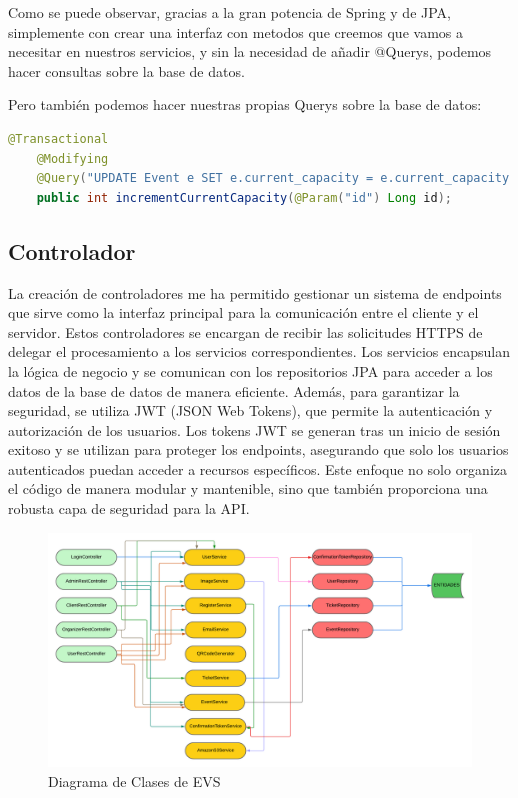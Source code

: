 Como se puede observar, gracias a la gran potencia de Spring y de JPA, simplemente con crear una interfaz con metodos que creemos que vamos a necesitar en 
nuestros servicios, y sin la necesidad de añadir @Querys, podemos hacer consultas sobre la base de datos.

Pero también podemos hacer nuestras propias Querys sobre la base de datos:
\myjavastyle
\begin{lstlisting}[language=Java, caption=Ejemplo de Query  en Spring Data JPA]
    @Transactional
    @Modifying
    @Query("UPDATE Event e SET e.current_capacity = e.current_capacity + 1 WHERE e.id = :id AND e.current_capacity + 1  <= e.max_capacity")
    public int incrementCurrentCapacity(@Param("id") Long id);
\end{lstlisting}

\subsection{Controlador}
La creación de controladores me ha permitido gestionar un sistema de endpoints que sirve como la interfaz principal 
para la comunicación entre el cliente y el servidor. Estos controladores se encargan de recibir las solicitudes HTTPS de delegar el procesamiento a 
los servicios correspondientes. Los servicios encapsulan la lógica de negocio y se comunican con los repositorios JPA para acceder a los datos de la 
base de datos de manera eficiente. Además, para garantizar la seguridad, se utiliza JWT (JSON Web Tokens), que permite la autenticación y autorización 
de los usuarios. Los tokens JWT se generan tras un inicio de sesión exitoso y se utilizan para proteger los endpoints, asegurando que solo los usuarios 
autenticados puedan acceder a recursos específicos. Este enfoque no solo organiza el código de manera modular y mantenible, sino que también proporciona 
una robusta capa de seguridad para la API.
\begin{figure}[h]
    \centering
    \includegraphics[width=1\textwidth]{DiagramaClases.png} 
    \caption{Diagrama de Clases de EVS}
    \label{fig:class_architecture}
\end{figure}

